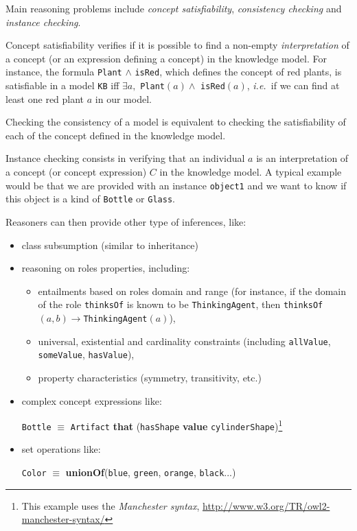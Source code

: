 \documentclass[a4paper, twocolumn]{article}
\newcommand{\ie}{{\textit{i.e.~}}}
\newcommand{\concept}[1]{{\footnotesize \texttt{#1}}}
\begin{document}
Main reasoning problems include \emph{concept satisfiability},
\emph{consistency checking} and \emph{instance checking}.

Concept satisfiability verifies if it is possible to find a non-empty
\emph{interpretation} of a concept (or an expression defining a concept) in the
knowledge model. For instance, the formula \concept{Plant} $\land$
\concept{isRed}, which defines the concept of red plants, is satisfiable in a
model \concept{KB} iff $\exists a, $ \concept{Plant}$(a) \land$
\concept{isRed}$(a)$, \ie if we can find at least one red plant $a$ in our
model.

Checking the consistency of a model is equivalent to checking the
satisfiability of each of the concept defined in the knowledge model.

Instance checking consists in verifying that an individual $a$ is an
interpretation of a concept (or concept expression) $C$ in the knowledge model.
A typical example would be that we are provided with an instance
\concept{object1} and we want to know if this object is a kind of
\concept{Bottle} or \concept{Glass}.

Reasoners can then provide other type of inferences, like:

\begin{itemize}
    \item class subsumption (similar to inheritance)

    \item reasoning on roles properties, including:
        \begin{itemize}
        \item entailments based on roles domain and range (for instance, if the
        domain of the role \concept{thinksOf} is known to be
        \concept{ThinkingAgent}, then \concept{thinksOf}$(a, b) \to
        $\concept{ThinkingAgent}$(a)$),

        \item universal, existential and cardinality constraints (including \concept{allValue}, 
        \concept{someValue}, \concept{hasValue}),

        \item property characteristics (symmetry, transitivity, etc.)

        \end{itemize}

    \item complex concept expressions like: \par \footnotesize \concept{Bottle}
    $\equiv$ \concept{Artifact} {\bf that} (\concept{hasShape} {\bf value}
    \concept{cylinderShape})\footnote{This example uses the \emph{Manchester
    syntax}, \url{http://www.w3.org/TR/owl2-manchester-syntax/}} \normalsize

    \item set operations like: \par \footnotesize \concept{Color} $\equiv$ {\bf
    unionOf}(\concept{blue}, \concept{green}, \concept{orange},
    \concept{black}...) \normalsize

\end{itemize}
\end{document}
